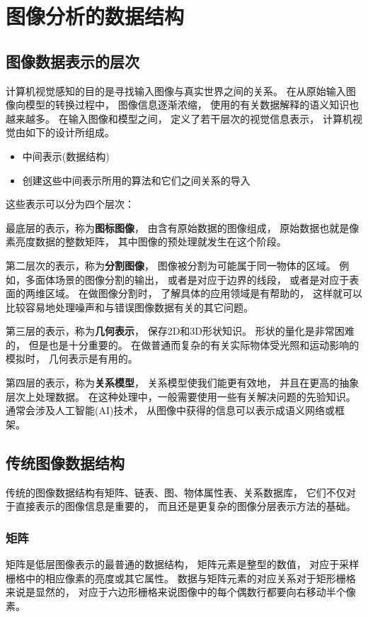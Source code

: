 \chapter{图像分析的数据结构}
\section{图像数据表示的层次}
计算机视觉感知的目的是寻找输入图像与真实世界之间的关系。%
在从原始输入图像向模型的转换过程中，%
图像信息逐渐浓缩，%
使用的有关数据解释的语义知识也越来越多。%
在输入图像和模型之间，%
定义了若干层次的视觉信息表示，%
计算机视觉由如下的设计所组成。
\begin{itemize}
\item{中间表示(数据结构)}
\item{创建这些中间表示所用的算法和它们之间关系的导入}
\end{itemize}

\noindent{}这些表示可以分为四个层次：

最底层的表示，称为\textbf{\color{magenta}图标图像}，%
由含有原始数据的图像组成，%
原始数据也就是像素亮度数据的整数矩阵，%
其中图像的预处理就发生在这个阶段。

第二层次的表示，称为\textbf{\color{magenta}分割图像}，%
图像被分割为可能属于同一物体的区域。%
例如，多面体场景的图像分割的输出，%
或者是对应于边界的线段，%
或者是对应于表面的两维区域。%
在做图像分割时，%
了解具体的应用领域是有帮助的，%
这样就可以比较容易地处理噪声和与错误图像数据有关的其它问题。

第三层的表示，称为\textbf{\color{magenta}几何表示}，%
保存2D和3D形状知识。%
形状的量化是非常困难的，%
但是也是十分重要的。%
在做普通而复杂的有关实际物体受光照和运动影响的模拟时，%
几何表示是有用的。

第四层的表示，称为\textbf{\color{magenta}关系模型}，%
关系模型使我们能更有效地，%
并且在更高的抽象层次上处理数据。%
在这种处理中，一般需要使用一些有关解决问题的先验知识。%
通常会涉及人工智能(AI)技术，%
从图像中获得的信息可以表示成语义网络或框架。

\section{传统图像数据结构}
传统的图像数据结构有矩阵、链表、图、物体属性表、关系数据库，%
它们不仅对于直接表示的图像信息是重要的，%
而且还是更复杂的图像分层表示方法的基础。

\subsection{矩阵}
矩阵是低层图像表示的最普通的数据结构，%
矩阵元素是整型的数值，%
对应于采样栅格中的相应像素的亮度或其它属性。%
数据与矩阵元素的对应关系对于矩形栅格来说是显然的，%
对应于六边形栅格来说图像中的每个偶数行都要向右移动半个像素。

